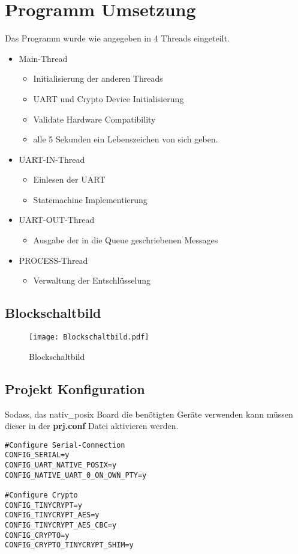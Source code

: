 \newpage
\section{Programm Umsetzung}
Das Programm wurde wie angegeben in 4 Threads eingeteilt.
\begin{itemize}
    \item Main-Thread
    \begin{itemize}
        \item Initialisierung der anderen Threads
        \item UART und Crypto Device Initialisierung 
        \item Validate Hardware Compatibility 
        \item alle 5 Sekunden ein Lebenszeichen von sich geben. 
    \end{itemize} 
    \item UART-IN-Thread
    \begin{itemize}
        \item Einlesen der UART 
        \item Statemachine Implementierung
    \end{itemize}
    \item UART-OUT-Thread
    \begin{itemize}
        \item Ausgabe der in die Queue geschriebenen Messages
    \end{itemize}
    \item PROCESS-Thread
    \begin{itemize}
        \item Verwaltung der Entschlüsselung 
    \end{itemize}
\end{itemize}
\subsection{Blockschaltbild}
\begin{figure}[!ht]
    \centering
    \texttt{[image: Blockschaltbild.pdf]}
    \caption{Blockschaltbild}
    \label{fig:Blockschaltbild}
\end{figure}




\newpage
\subsection{Projekt Konfiguration}
Sodass, das nativ\_posix Board die benötigten Geräte verwenden kann müssen dieser in der \textbf{prj.conf} Datei aktivieren werden. 
\begin{lstlisting}[style=StyleC, captionpos=b, caption=prj.conf, label=pjr.conf]
#Configure Serial-Connection
CONFIG_SERIAL=y
CONFIG_UART_NATIVE_POSIX=y
CONFIG_NATIVE_UART_0_ON_OWN_PTY=y

#Configure Crypto
CONFIG_TINYCRYPT=y
CONFIG_TINYCRYPT_AES=y
CONFIG_TINYCRYPT_AES_CBC=y
CONFIG_CRYPTO=y
CONFIG_CRYPTO_TINYCRYPT_SHIM=y
\end{lstlisting}

